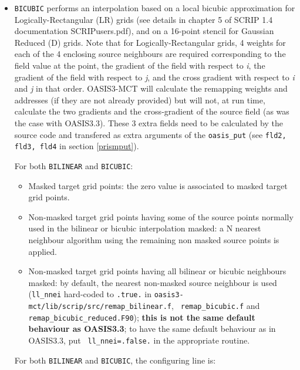 \begin{itemize}
\begin{itemize}
  \item {\tt BICUBIC} performs an interpolation based on a local
    bicubic approximation for Logically-Rectangular (LR) grids (see
    details in chapter 5 of SCRIP 1.4 documentation SCRIPusers.pdf),
    and on a 16-point stencil for Gaussian Reduced (D) grids.  Note
    that for Logically-Rectangular grids, 4 weights for each of the 4
    enclosing source neighbours are required corresponding to the
    field value at the point, the gradient of the field with respect
    to {\it i}, the gradient of the field with respect to {\it j}, and
    the cross gradient with respect to {\it i} and {\it j} in that
    order. OASIS3-MCT will calculate the remapping weights and
    addresses (if they are not already provided) but will not, at run
    time, calculate the two gradients and the cross-gradient of the
    source field (as was the case with OASIS3.3). These 3 extra fields
    need to be calculated by the source code and transfered as extra
    arguments of the {\tt oasis\_put} (see {\tt fld2, fld3, fld4} in
    section \ref{prismput}).

    For both {\tt BILINEAR} and {\tt BICUBIC}:
    \begin{itemize}
    \item Masked target grid points: the zero value is associated to
      masked target grid points.

    \item Non-masked target grid points having some of the source
      points normally used in the bilinear or bicubic interpolation
      masked: a N nearest neighbour algorithm using the remaining non
      masked source points is applied.

    \item Non-masked target grid points having all bilinear or bicubic
      neighbours masked: by default, the nearest non-masked source
      neighbour is used ({\tt ll\_nnei} hard-coded to {\tt .true.} in
      {\tt oasis3-mct/lib/scrip/src/remap\_bilinear.f}, {\tt
        remap\_bicubic.f} and {\tt remap\_bicubic\_reduced.F90}); {\bf
        this is not the same default behaviour as OASIS3.3}; to have
      the same default behaviour as in OASIS3.3, put {\tt
        ll\_nnei=.false.} in the appropriate routine.
    \end{itemize}
 
    For both {\tt BILINEAR} and {\tt BICUBIC}, the configuring line
    is:


\end{itemize}
\end{itemize}

